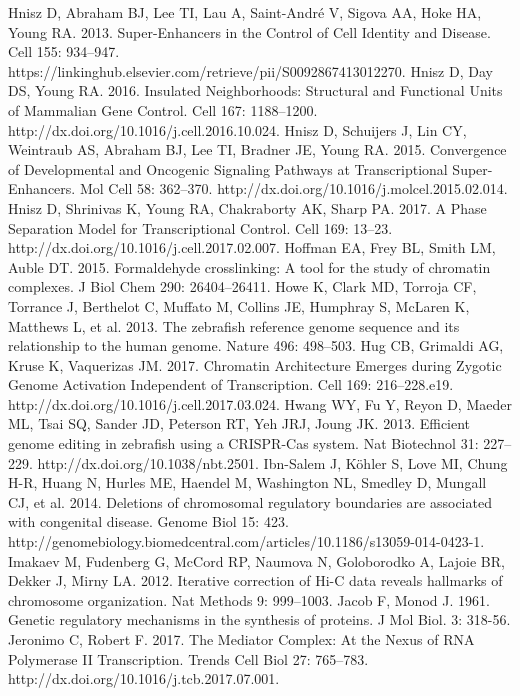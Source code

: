 \begin{thebibliography}{1}
	 Hnisz D, Abraham BJ, Lee TI, Lau A, Saint-André V, Sigova AA, Hoke HA, Young RA. 2013. Super-Enhancers in the Control of Cell Identity and Disease. Cell 155: 934–947. https://linkinghub.elsevier.com/retrieve/pii/S0092867413012270.
	 Hnisz D, Day DS, Young RA. 2016. Insulated Neighborhoods: Structural and Functional Units of Mammalian Gene Control. Cell 167: 1188–1200. http://dx.doi.org/10.1016/j.cell.2016.10.024.
	 Hnisz D, Schuijers J, Lin CY, Weintraub AS, Abraham BJ, Lee TI, Bradner JE, Young RA. 2015. Convergence of Developmental and Oncogenic Signaling Pathways at Transcriptional Super-Enhancers. Mol Cell 58: 362–370. http://dx.doi.org/10.1016/j.molcel.2015.02.014.
	 Hnisz D, Shrinivas K, Young RA, Chakraborty AK, Sharp PA. 2017. A Phase Separation Model for Transcriptional Control. Cell 169: 13–23. http://dx.doi.org/10.1016/j.cell.2017.02.007.
	 Hoffman EA, Frey BL, Smith LM, Auble DT. 2015. Formaldehyde crosslinking: A tool for the study of chromatin complexes. J Biol Chem 290: 26404–26411.
	 Howe K, Clark MD, Torroja CF, Torrance J, Berthelot C, Muffato M, Collins JE, Humphray S, McLaren K, Matthews L, et al. 2013. The zebrafish reference genome sequence and its relationship to the human genome. Nature 496: 498–503.
	 Hug CB, Grimaldi AG, Kruse K, Vaquerizas JM. 2017. Chromatin Architecture Emerges during Zygotic Genome Activation Independent of Transcription. Cell 169: 216–228.e19. http://dx.doi.org/10.1016/j.cell.2017.03.024.
	 Hwang WY, Fu Y, Reyon D, Maeder ML, Tsai SQ, Sander JD, Peterson RT, Yeh JRJ, Joung JK. 2013. Efficient genome editing in zebrafish using a CRISPR-Cas system. Nat Biotechnol 31: 227–229. http://dx.doi.org/10.1038/nbt.2501.
	 Ibn-Salem J, Köhler S, Love MI, Chung H-R, Huang N, Hurles ME, Haendel M, Washington NL, Smedley D, Mungall CJ, et al. 2014. Deletions of chromosomal regulatory boundaries are associated with congenital disease. Genome Biol 15: 423. http://genomebiology.biomedcentral.com/articles/10.1186/s13059-014-0423-1.
	 Imakaev M, Fudenberg G, McCord RP, Naumova N, Goloborodko A, Lajoie BR, Dekker J, Mirny LA. 2012. Iterative correction of Hi-C data reveals hallmarks of chromosome organization. Nat Methods 9: 999–1003.
	 Jacob F, Monod J. 1961. Genetic regulatory mechanisms in the synthesis of proteins. J Mol Biol. 3: 318-56.
	 Jeronimo C, Robert F. 2017. The Mediator Complex: At the Nexus of RNA Polymerase II Transcription. Trends Cell Biol 27: 765–783. http://dx.doi.org/10.1016/j.tcb.2017.07.001.

\end{thebibliography}
